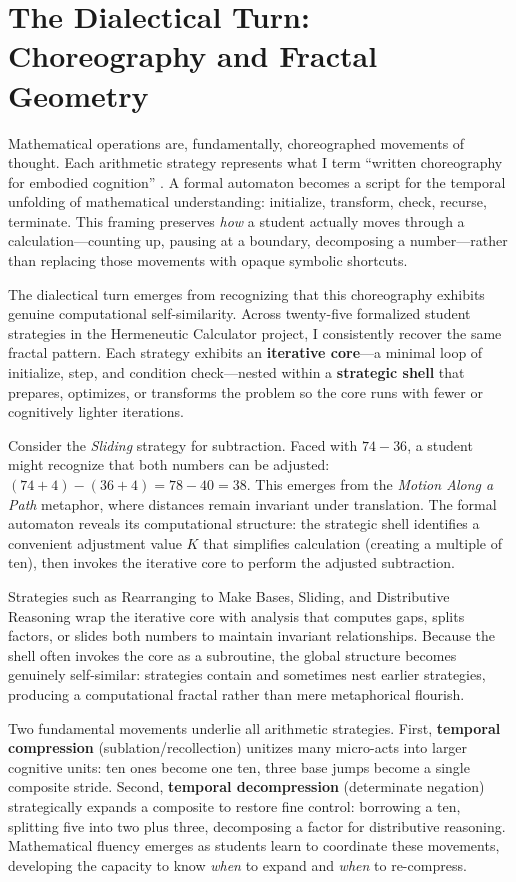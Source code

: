 \documentclass[12pt]{book}
\begin{document}
\section{The Dialectical Turn: Choreography and Fractal Geometry}

Mathematical operations are, fundamentally, choreographed movements of thought. Each arithmetic strategy represents what I term \enquote{written choreography for embodied cognition} \parencite{savich_hermeneutic_nodate}. A formal automaton becomes a script for the temporal unfolding of mathematical understanding: initialize, transform, check, recurse, terminate. This framing preserves \textit{how} a student actually moves through a calculation---counting up, pausing at a boundary, decomposing a number---rather than replacing those movements with opaque symbolic shortcuts.

The dialectical turn emerges from recognizing that this choreography exhibits genuine computational self-similarity. Across twenty-five formalized student strategies in the Hermeneutic Calculator project, I consistently recover the same fractal pattern. Each strategy exhibits an \textbf{iterative core}---a minimal loop of initialize, step, and condition check---nested within a \textbf{strategic shell} that prepares, optimizes, or transforms the problem so the core runs with fewer or cognitively lighter iterations.

Consider the \textit{Sliding} strategy for subtraction. Faced with $74 - 36$, a student might recognize that both numbers can be adjusted: $(74 + 4) - (36 + 4) = 78 - 40 = 38$. This emerges from the \textit{Motion Along a Path} metaphor, where distances remain invariant under translation. The formal automaton reveals its computational structure: the strategic shell identifies a convenient adjustment value $K$ that simplifies calculation (creating a multiple of ten), then invokes the iterative core to perform the adjusted subtraction.

Strategies such as Rearranging to Make Bases, Sliding, and Distributive Reasoning wrap the iterative core with analysis that computes gaps, splits factors, or slides both numbers to maintain invariant relationships. Because the shell often invokes the core as a subroutine, the global structure becomes genuinely self-similar: strategies contain and sometimes nest earlier strategies, producing a computational fractal rather than mere metaphorical flourish.

Two fundamental movements underlie all arithmetic strategies. First, \textbf{temporal compression} (sublation/recollection) unitizes many micro-acts into larger cognitive units: ten ones become one ten, three base jumps become a single composite stride. Second, \textbf{temporal decompression} (determinate negation) strategically expands a composite to restore fine control: borrowing a ten, splitting five into two plus three, decomposing a factor for distributive reasoning. Mathematical fluency emerges as students learn to coordinate these movements, developing the capacity to know \textit{when} to expand and \textit{when} to re-compress.
\end{document}
